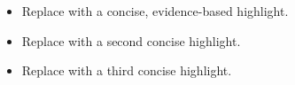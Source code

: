 \begin{itemize}
  \item Replace with a concise, evidence-based highlight.
  \item Replace with a second concise highlight.
  \item Replace with a third concise highlight.
\end{itemize}
